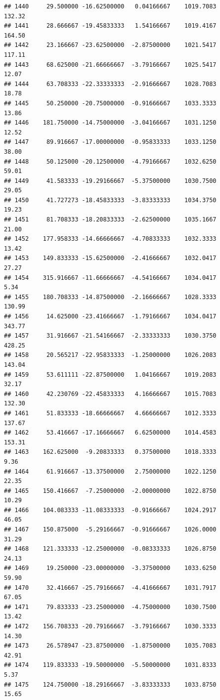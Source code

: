 \documentclass[
]{article}
\begin{document}
\begin{verbatim}
## 1440     29.500000 -16.62500000   0.04166667    1019.7083      132.32
## 1441     28.666667 -19.45833333   1.54166667    1019.4167      164.50
## 1442     23.166667 -23.62500000  -2.87500000    1021.5417      117.11
## 1443     68.625000 -21.66666667  -3.79166667    1025.5417       12.07
## 1444     63.708333 -22.33333333  -2.91666667    1028.7083       18.78
## 1445     50.250000 -20.75000000  -0.91666667    1033.3333       13.86
## 1446    181.750000 -14.75000000  -3.04166667    1031.1250       12.52
## 1447     89.916667 -17.00000000  -0.95833333    1033.1250       38.00
## 1448     50.125000 -20.12500000  -4.79166667    1032.6250       59.01
## 1449     41.583333 -19.29166667  -5.37500000    1030.7500       29.05
## 1450     41.727273 -18.45833333  -3.83333333    1034.3750       19.23
## 1451     81.708333 -18.20833333  -2.62500000    1035.1667       21.00
## 1452    177.958333 -14.66666667  -4.70833333    1032.3333       13.42
## 1453    149.833333 -15.62500000  -2.41666667    1032.0417       27.27
## 1454    315.916667 -11.66666667  -4.54166667    1034.0417        5.34
## 1455    180.708333 -14.87500000  -2.16666667    1028.3333      130.99
## 1456     14.625000 -23.41666667  -1.79166667    1034.0417      343.77
## 1457     31.916667 -21.54166667  -2.33333333    1030.3750      428.25
## 1458     20.565217 -22.95833333  -1.25000000    1026.2083      143.04
## 1459     53.611111 -22.87500000   1.04166667    1019.2083       32.17
## 1460     42.230769 -22.45833333   4.16666667    1015.7083      132.30
## 1461     51.833333 -18.66666667   4.66666667    1012.3333      137.67
## 1462     53.416667 -17.16666667   6.62500000    1014.4583      153.31
## 1463    162.625000  -9.20833333   0.37500000    1018.3333        9.36
## 1464     61.916667 -13.37500000   2.75000000    1022.1250       22.35
## 1465    150.416667  -7.25000000  -2.00000000    1022.8750       10.29
## 1466    104.083333 -11.08333333  -0.91666667    1024.2917       46.05
## 1467    150.875000  -5.29166667  -0.91666667    1026.0000       31.29
## 1468    121.333333 -12.25000000  -0.08333333    1026.8750       24.13
## 1469     19.250000 -23.00000000  -3.37500000    1033.6250       59.90
## 1470     32.416667 -25.79166667  -4.41666667    1031.7917       67.05
## 1471     79.833333 -23.25000000  -4.75000000    1030.7500       13.42
## 1472    156.708333 -20.79166667  -3.79166667    1030.3333       14.30
## 1473     26.578947 -23.87500000  -1.87500000    1035.7083       42.91
## 1474    119.833333 -19.50000000  -5.50000000    1031.8333        5.37
## 1475    124.750000 -18.29166667  -3.83333333    1033.8750       15.65

\end{verbatim}
\end{document}

